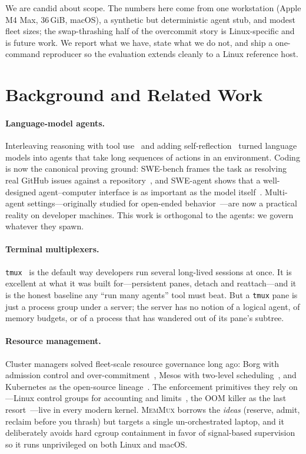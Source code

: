 \documentclass[11pt]{article}
\newcommand{\sys}{\textsc{MemMux}}
\newcommand{\code}[1]{\texttt{#1}}
\begin{document}
We are candid about scope. The numbers here come from one workstation (Apple M4 Max, 36\,GiB,
macOS), a synthetic but deterministic agent stub, and modest fleet sizes; the swap-thrashing half of
the overcommit story is Linux-specific and is future work. We report what we have, state what we do
not, and ship a one-command reproducer so the evaluation extends cleanly to a Linux reference host.

\section{Background and Related Work}

\paragraph{Language-model agents.} Interleaving reasoning with tool use~\citep{yao2023react} and
adding self-reflection~\citep{shinn2023reflexion} turned language models into agents that take long
sequences of actions in an environment. Coding is now the canonical proving ground: SWE-bench frames
the task as resolving real GitHub issues against a repository~\citep{jimenez2024swebench}, and
SWE-agent shows that a well-designed agent--computer interface is as important as the model
itself~\citep{yang2024sweagent}. Multi-agent settings---originally studied for open-ended
behavior~\citep{park2023generative}---are now a practical reality on developer machines. This work is
orthogonal to the agents: we govern whatever they spawn.

\paragraph{Terminal multiplexers.} \code{tmux}~\citep{tmux} is the default way developers run several
long-lived sessions at once. It is excellent at what it was built for---persistent panes, detach and
reattach---and it is the honest baseline any ``run many agents'' tool must beat. But a \code{tmux}
pane is just a process group under a server; the server has no notion of a logical agent, of memory
budgets, or of a process that has wandered out of its pane's subtree.

\paragraph{Resource management.} Cluster managers solved fleet-scale resource governance long ago:
Borg with admission control and over-commitment~\citep{verma2015borg}, Mesos with two-level
scheduling~\citep{hindman2011mesos}, and Kubernetes as the open-source
lineage~\citep{kubernetes}. The enforcement primitives they rely on---Linux control groups for
accounting and limits~\citep{cgroupv2}, the OOM killer as the last resort~\citep{linuxoom}---live in
every modern kernel. \sys{} borrows the \emph{ideas} (reserve, admit, reclaim before you thrash) but
targets a single un-orchestrated laptop, and it deliberately avoids hard cgroup containment in favor
of signal-based supervision so it runs unprivileged on both Linux and macOS.
\end{document}
